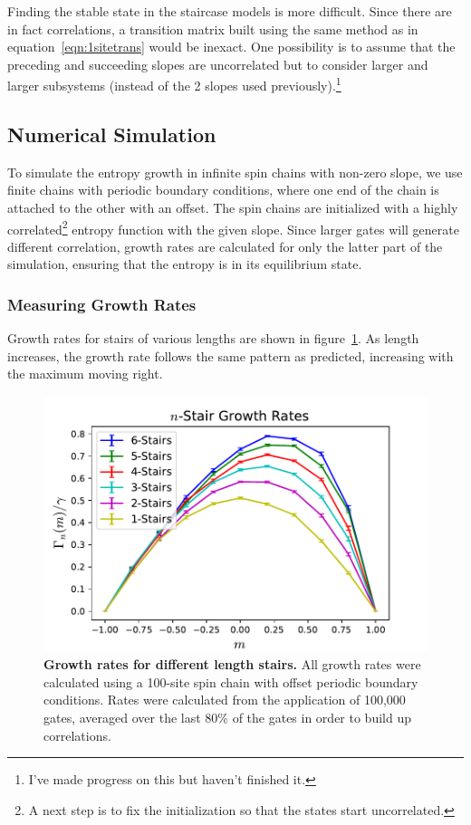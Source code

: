 Finding the stable state in the staircase models is more difficult. Since there are in fact correlations, a transition matrix built using the same method as in equation~\ref{eqn:1sitetrans} would be inexact. One possibility is to assume that the preceding and succeeding slopes are uncorrelated but to consider larger and larger subsystems (instead of the 2 slopes used previously).\footnote{I've made progress on this but haven't finished it.}

\subsection{Numerical Simulation} \label{sub:num}

To simulate the entropy growth in infinite spin chains with non-zero slope, we use finite chains with periodic boundary conditions, where one end of the chain is attached to the other with an offset. The spin chains are initialized with a highly correlated\footnote{A next step is to fix the initialization so that the states start uncorrelated.} entropy function with the given slope. Since larger gates will generate different correlation, growth rates are calculated for only the latter part of the simulation, ensuring that the entropy is in its equilibrium state.

\subsubsection{Measuring Growth Rates}  \label{subsub:growthrates}

Growth rates for stairs of various lengths are shown in figure~\ref{fig:compareRates}. As length increases, the growth rate follows the same pattern as predicted, increasing with the maximum moving right. 
\begin{figure}
	\centering
	\includegraphics[width=.5\textwidth]{compareRates.pdf}
	\caption{\textbf{Growth rates for different length stairs.} All growth rates were calculated using a 100-site spin chain with offset periodic boundary conditions. Rates were calculated from the application of 100,000 gates, averaged over the last 80\% of the gates in order to build up correlations.}
	\label{fig:compareRates}
\end{figure}

